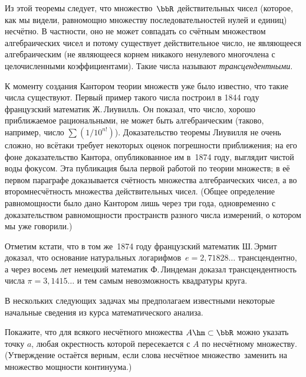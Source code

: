Из этой теоремы следует, что множество~$\bbR$\index{$\bbR$} действительных
чисел (которое, как мы видели, равномощно множеству
последовательностей нулей и единиц) не\-счёт\-но. В частности, оно
не может совпадать со счётным множеством алгебраических чисел и
потому существует действительное число, не являющееся
алгебраическим (не являющееся корнем никакого ненулевого многочлена
с целочисленными коэффициентами). Такие числа называют
\emph{трансцендентными}.

\begin{historyremark}
К моменту создания Кантором теории множеств уже было известно,
что такие числа существуют. Первый пример такого числа построил
в 1844 году французский математик Ж.\,Лиувилль. Он
показал, что число, хорошо приближаемое рациональными, не может
быть алгебраическим (таково, например, число $\sum(1/10^{n!})$).
Доказательство теоремы Лиувилля не очень сложно, но всё\д таки
требует некоторых оценок погрешности приближения; на его фоне
доказательство Кантора, опубликованное им в~1874 году, выглядит
чистой воды фокусом. Эта публикация была первой работой
по теории множеств; в её первом параграфе доказывается
счётность множества алгебраических чисел, а во втором\т несчётность
множества действительных чисел. (Общее определение равномощности
было дано Кантором лишь через три года, одновременно с доказательством
равномощности пространств разного числа измерений, о котором мы
уже говорили.)

Отметим кстати, что в том же~1874 году французский математик
Ш.\,Эрмит доказал, что основание
натуральных логарифмов~$e=2{,}71828\ldots$ трансцендентно, а
через восемь лет немецкий математик
Ф.\,Линдеман доказал
трансцендентность числа $\pi=3{,}1415\ldots$ и тем самым
невозможность квадратуры круга.
\end{historyremark}

В нескольких следующих задачах мы предполагаем известными
некоторые начальные сведения из курса математического анализа.

\begin{problem}
Покажите, что для всякого несчётного множества $A\hm\subset\bbR$
можно указать точку $a$, любая окрестность которой пересекается
с $A$ по несчётному множеству. (Утверждение остаётся верным,
если слова  несчётное множество\ заменить на  множество
мощности континуума.)
\end{problem}

